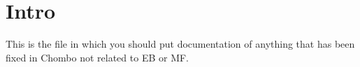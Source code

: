 \section{Intro}

This is the file in which you should put documentation of anything
that has been fixed in Chombo not related to EB or MF.


